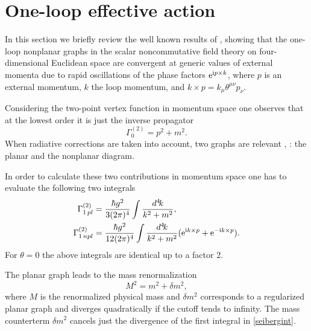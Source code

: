 \documentclass[a4paper,12pt]{article}
\begin{document}
\section{One-loop effective action} \label{effect}
In this section we briefly review the well known results of \cite{Minwalla:1999px}, \cite{VanRaamsdonk:2000rr} showing that the one-loop nonplanar graphs in the scalar noncommutative field theory on four-dimensional Euclidean space are convergent at generic values of external momenta due to rapid oscillations of the phase factors $\mathrm{e}^{\mathrm{i} p \times k}$, where $p$ is an external momentum, $k$ the loop momentum, and $k \times p = k_\mu \theta^{\mu\nu} p_\nu$. 

Considering the two-point vertex function in momentum space one observes that at the lowest order it is just the inverse propagator
\begin{equation}
  \Gamma_0^{(2)} = p^2 + m^2.
\end{equation}
When radiative corrections are taken into account, two graphs are relevant \cite{Minwalla:1999px}, \cite{VanRaamsdonk:2000rr}: the planar and the nonplanar diagram.  

In order to calculate these two contributions in momentum space one has to evaluate the following two integrals 
\begin{align}
  \label{seibergint}
  \Gamma^{(2)}_{1 \, pl} &= \frac{\hbar g^2}{3(2\pi)^4} \int \frac{d^4\!k}
    {k^2 + m^2},  \nonumber \\
  \Gamma^{(2)}_{1 \, npl} &= \frac{\hbar g^2}{12(2\pi)^4} \int \frac{d^4\!k}
    {k^2 + m^2} ( \mathrm{e}^{\mathrm{i} k \times p} + \mathrm{e}^{-\mathrm{i} k \times p} ).
\end{align}
For $\theta=0$ the above integrals are identical up to a factor 2.

The planar graph leads to the mass renormalization 
\begin{equation}
  M^2 = m^2 + \delta m^2,
\end{equation}
where $M$ is the renormalized physical mass and $\delta m^2$ corresponds to a regularized planar graph and diverges quadratically if the cutoff tends to infinity. The mass counterterm $\delta m^2$ cancels just the divergence of the first integral in \eqref{seibergint}.
\end{document}
